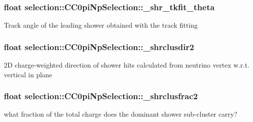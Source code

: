 \subsubsection[{\texorpdfstring{\+\_\+shr\+\_\+tkfit\+\_\+theta}{_shr_tkfit_theta}}]{\setlength{\rightskip}{0pt plus 5cm}float selection\+::\+C\+C0pi\+Np\+Selection\+::\+\_\+shr\+\_\+tkfit\+\_\+theta\hspace{0.3cm}{\ttfamily [private]}}\hypertarget{classselection_1_1CC0piNpSelection_a11df391e482434665c389423bbb9ec5d}{}\label{classselection_1_1CC0piNpSelection_a11df391e482434665c389423bbb9ec5d}
Track angle of the leading shower obtained with the track fitting 
\subsubsection[{\texorpdfstring{\+\_\+shrclusdir2}{_shrclusdir2}}]{\setlength{\rightskip}{0pt plus 5cm}float selection\+::\+C\+C0pi\+Np\+Selection\+::\+\_\+shrclusdir2\hspace{0.3cm}{\ttfamily [private]}}\hypertarget{classselection_1_1CC0piNpSelection_a62af9f6d72d725a3109705e27e635d29}{}\label{classselection_1_1CC0piNpSelection_a62af9f6d72d725a3109705e27e635d29}
2D charge-\/weighted direction of shower hits calculated from neutrino vertex w.\+r.\+t. vertical in plane 
\subsubsection[{\texorpdfstring{\+\_\+shrclusfrac2}{_shrclusfrac2}}]{\setlength{\rightskip}{0pt plus 5cm}float selection\+::\+C\+C0pi\+Np\+Selection\+::\+\_\+shrclusfrac2\hspace{0.3cm}{\ttfamily [private]}}\hypertarget{classselection_1_1CC0piNpSelection_acf870c688a80fa995ed5c6245fa02608}{}\label{classselection_1_1CC0piNpSelection_acf870c688a80fa995ed5c6245fa02608}
what fraction of the total charge does the dominant shower sub-\/cluster carry? 
